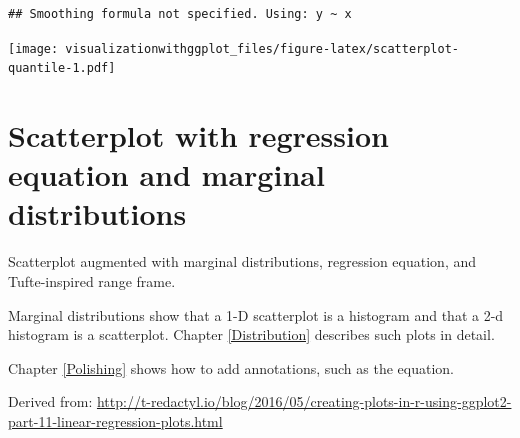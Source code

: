 \documentclass[]{krantz}
\begin{document}
\begin{verbatim}
## Smoothing formula not specified. Using: y ~ x
\end{verbatim}

\texttt{[image: visualizationwithggplot\_files/figure-latex/scatterplot-quantile-1.pdf]}

\hypertarget{scatterplot-with-regression-equation-and-marginal-distributions}{%
\section{Scatterplot with regression equation and marginal distributions}\label{scatterplot-with-regression-equation-and-marginal-distributions}}

Scatterplot augmented with marginal distributions, regression equation, and Tufte-inspired range frame.

Marginal distributions show that a 1-D scatterplot is a histogram and that a 2-d histogram is a scatterplot. Chapter \ref{Distribution} describes such plots in detail.

Chapter \ref{Polishing} shows how to add annotations, such as the equation.

Derived from:
\url{http://t-redactyl.io/blog/2016/05/creating-plots-in-r-using-ggplot2-part-11-linear-regression-plots.html}
\end{document}

